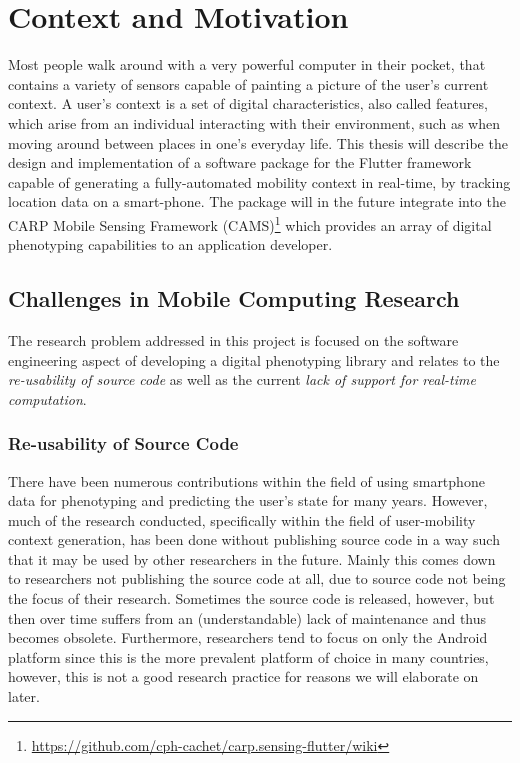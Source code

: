 \section{Context and Motivation}


Most people walk around with a very powerful computer in their pocket, that contains a variety of sensors capable of painting a picture of the user's current context. A user's context is a set of digital characteristics, also called features, which arise from an individual interacting with their environment, such as when moving around between places in one's everyday life. This thesis will describe the design and implementation of a software package for the Flutter framework capable of generating a fully-automated mobility context in real-time, by tracking location data on a smart-phone. The package will in the future integrate into the CARP Mobile Sensing Framework (CAMS)\footnote{\url{https://github.com/cph-cachet/carp.sensing-flutter/wiki}} which provides an array of digital phenotyping capabilities to an application developer.\\

\subsection*{Challenges in Mobile Computing Research}
The research problem addressed in this project is focused on the software engineering aspect of developing a digital phenotyping library and relates to the \textit{re-usability of source code} as well as the current \textit{lack of support for real-time computation}.

\subsubsection*{Re-usability of Source Code}
There have been numerous contributions within the field of using smartphone data for phenotyping and predicting the user's state for many years. However, much of the research conducted, specifically within the field of user-mobility context generation, has been done without publishing source code in a way such that it may be used by other researchers in the future. Mainly this comes down to researchers not publishing the source code at all, due to source code not being the focus of their research. Sometimes the source code is released, however, but then over time suffers from an (understandable) lack of maintenance and thus becomes obsolete. Furthermore, researchers tend to focus on only the Android platform since this is the more prevalent platform of choice in many countries, however, this is not a good research practice for reasons we will elaborate on later.

